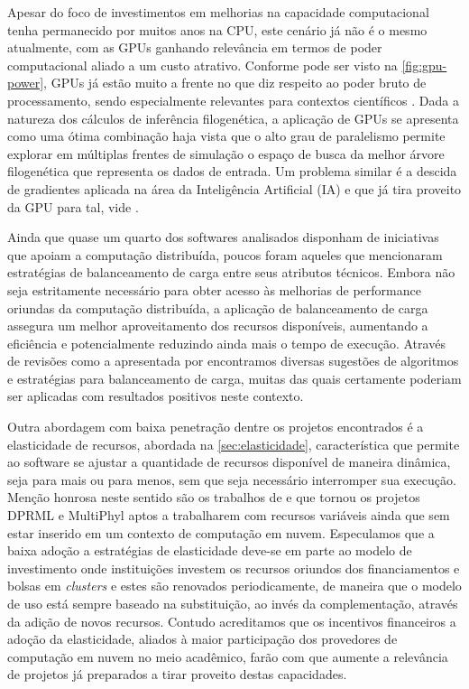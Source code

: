 \documentclass[english,brazilian]{UNISINOSmonografia} %
\begin{document}


Apesar do foco de investimentos em melhorias na capacidade computacional tenha permanecido por muitos anos na CPU, este cenário já não é o mesmo atualmente, com as GPUs ganhando relevância em termos de poder computacional aliado a um custo atrativo.
Conforme pode ser visto na \autoref{fig:gpu-power}, GPUs já estão muito a frente no que diz respeito ao poder bruto de processamento, sendo especialmente relevantes para contextos científicos \cite{Aji2013}.
Dada a natureza dos cálculos de inferência filogenética, a aplicação de GPUs se apresenta como uma ótima combinação haja vista que o alto grau de paralelismo permite explorar em múltiplas frentes de simulação o espaço de busca da melhor árvore filogenética que representa os dados de entrada.
Um problema similar é a descida de gradientes aplicada na área da Inteligência Artificial (IA) e que já tira proveito da GPU para tal, vide .




Ainda que quase um quarto dos softwares analisados disponham de iniciativas que apoiam a computação distribuída, poucos foram aqueles que mencionaram estratégias de balanceamento de carga entre seus atributos técnicos.
Embora não seja estritamente necessário para obter acesso às melhorias de performance oriundas da computação distribuída, a aplicação de balanceamento de carga assegura um melhor aproveitamento dos recursos disponíveis, aumentando a eficiência e potencialmente reduzindo ainda mais o tempo de execução.
Através de revisões como a apresentada por  encontramos diversas sugestões de algoritmos e estratégias para balanceamento de carga, muitas das quais certamente poderiam ser aplicadas com resultados positivos neste contexto.




Outra abordagem com baixa penetração dentre os projetos encontrados é a elasticidade de recursos, abordada na \autoref{sec:elasticidade}, característica que permite ao software se ajustar a quantidade de recursos disponível de maneira dinâmica, seja para mais ou para menos, sem que seja necessário interromper sua execução.
Menção honrosa neste sentido são os trabalhos de  e  que tornou os projetos DPRML e MultiPhyl aptos a trabalharem com recursos variáveis ainda que sem estar inserido em um contexto de computação em nuvem.
Especulamos que a baixa adoção a estratégias de elasticidade deve-se em parte ao modelo de investimento onde instituições investem os recursos oriundos dos financiamentos e bolsas em \textit{clusters} e estes são renovados periodicamente, de maneira que o modelo de uso está sempre baseado na substituição, ao invés da complementação, através da adição de novos recursos.
Contudo acreditamos que os incentivos financeiros a adoção da elasticidade, aliados à maior participação dos provedores de computação em nuvem no meio acadêmico, farão com que aumente a relevância de projetos já preparados a tirar proveito destas capacidades.
\end{document}
